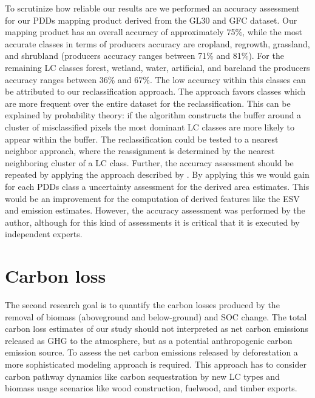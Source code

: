 		To scrutinize how reliable our results are we performed an accuracy assessment for our \acp{PDD} mapping product derived from the \ac{GL30} and \ac{GFC} dataset. Our mapping product has an overall accuracy of approximately 75\%, while the most accurate classes in terms of producers accuracy are cropland, regrowth, grassland, and shrubland (producers accuracy ranges between 71\% and 81\%). For the remaining \ac{LC} classes forest, wetland, water, artificial, and bareland the producers accuracy ranges between 36\% and 67\%. The low accuracy within this classes can be attributed to our reclassification approach. The approach favors classes which are more frequent over the entire dataset for the reclassification. This can be explained by probability theory: if the algorithm constructs the buffer around a cluster of misclassified pixels the most dominant \ac{LC} classes are more likely to appear within the buffer. The reclassification could be tested to a nearest neighbor approach, where the reassignment is determined by the nearest neighboring cluster of a \ac{LC} class. Further, the accuracy assessment should be repeated by applying the approach described by \citet{Olofsson2014}. By applying this we would gain for each \acp{PDD} class a uncertainty assessment for the derived area estimates. This would be an improvement for the computation of derived features like the \ac{ESV} and emission estimates. However, the accuracy assessment was performed by the author, although for this kind of assessments it is critical that it is executed by independent experts.

	\section{Carbon loss}
		The second research goal is to quantify the carbon losses produced by the removal of biomass (aboveground and below-ground) and \ac{SOC} change. The total carbon loss estimates of our study should not interpreted as net carbon emissions released as \ac{GHG} to the atmosphere, but as a potential anthropogenic carbon emission source. To assess the net carbon emissions released by deforestation a more sophisticated modeling approach is required. This approach has to consider carbon pathway dynamics like carbon sequestration by new \ac{LC} types and biomass usage scenarios like wood construction, fuelwood, and timber exports.

